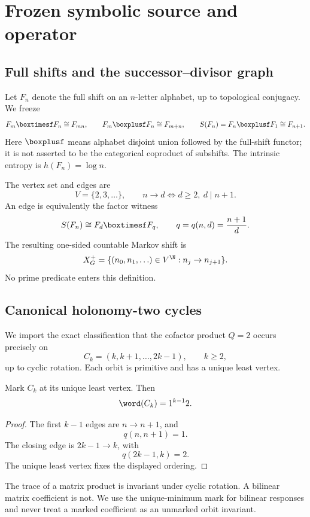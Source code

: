 \section{Frozen symbolic source and operator}
\label{sec:source}

\subsection{Full shifts and the successor--divisor graph}

Let \(F_n\) denote the full shift on an \(n\)-letter alphabet, up to
topological conjugacy.  We freeze
\[
 F_m\boxtimesf F_n\cong F_{mn},\qquad
 F_m\boxplusf F_n\cong F_{m+n},\qquad
 S(F_n)=F_n\boxplusf F_1\cong F_{n+1}.
\]
Here \(\boxplusf\) means alphabet disjoint union followed by the full-shift
functor; it is not asserted to be the categorical coproduct of subshifts.
The intrinsic entropy is \(h(F_n)=\log n\).

The vertex set and edges are
\[
 V=\{2,3,\ldots\},\qquad
 n\longrightarrow d
 \iff d\ge2,\ d\mid n+1.
\]
An edge is equivalently the factor witness
\[
        S(F_n)\cong F_d\boxtimesf F_q,
\qquad
        q=q(n,d)=\frac{n+1}{d}.
\]
The resulting one-sided countable Markov shift is
\[
 X_G^+
 =\{(n_0,n_1,\ldots)\in V^\N:n_j\to n_{j+1}\}.
\]
No prime predicate enters this definition.

\subsection{Canonical holonomy-two cycles}

We import the exact classification that the cofactor product \(Q=2\) occurs
precisely on
\[
        C_k=(k,k+1,\ldots,2k-1),\qquad k\ge2,
\]
up to cyclic rotation.  Each orbit is primitive and has a unique least
vertex.

\begin{theorem}
\label{thm:word}
Mark \(C_k\) at its unique least vertex.  Then
\[
        \word(C_k)=1^{k-1}2.
\]
\end{theorem}

\begin{proof}
The first \(k-1\) edges are \(n\to n+1\), and
\[
        q(n,n+1)=1.
\]
The closing edge is \(2k-1\to k\), with
\[
        q(2k-1,k)=2.
\]
The unique least vertex fixes the displayed ordering.
\end{proof}

\begin{remark}
The trace of a matrix product is invariant under cyclic rotation.  A
bilinear matrix coefficient is not.  We use the unique-minimum mark for
bilinear responses and never treat a marked coefficient as an unmarked
orbit invariant.
\end{remark}

